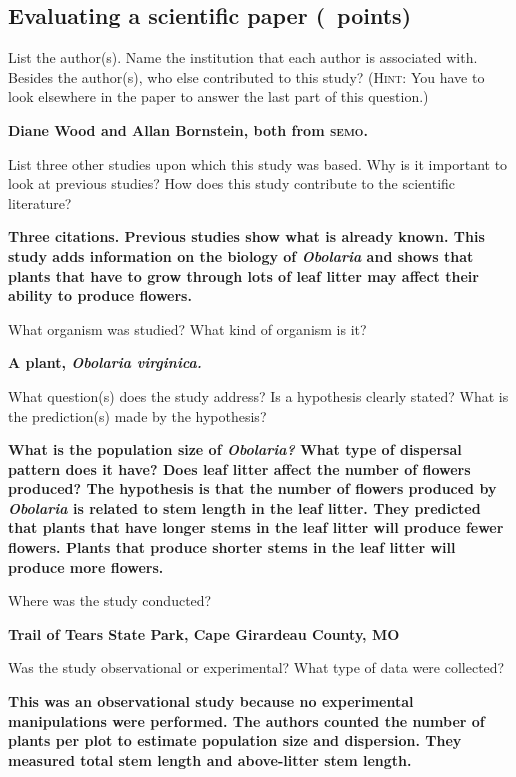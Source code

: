 \documentclass[12pt, hidelinks, addpoints]{exam}
\newcommand*\AnswerBox[2]{%
    \parbox[t][#1]{0.92\textwidth}{%
    \vspace{-0.5\baselineskip}\begin{solution}\textbf{#2}\end{solution}}
}
\newlength{\basespace}
\begin{document}
\subsection*{Evaluating a scientific paper (\numpoints~points)}

\begin{questions}

\question[1]
List the author(s). Name the institution that each author is associated with. 
Besides the author(s), who else contributed to this study? (\textsc{Hint:} You have to look elsewhere in the paper to answer the last part of this question.)

\AnswerBox{3\baselineskip}{%
Diane Wood and Allan Bornstein, both from \textsc{semo}.
}

\question[1]
List three other studies upon which this study was based. Why is it important to look at previous studies? How does this study contribute to the scientific literature?

\AnswerBox{1.75\basespace}{%
Three citations. Previous studies show what is already known. This study adds information on the biology of \textit{Obolaria} and shows that plants that have to grow through lots of leaf litter may affect their ability to produce flowers.
}

\question[1]
What organism was studied? What kind of organism is it?

\AnswerBox{2\baselineskip}{A plant, \textit{Obolaria virginica.}}


\question[1]
What question(s) does the study address? Is a hypothesis
clearly stated? What is the prediction(s) made by the hypothesis?

\AnswerBox{1.75\basespace}{What is the population size of \textit{Obolaria?} What type of dispersal pattern does it have? Does leaf litter affect the number of flowers produced? The hypothesis is that the number of flowers produced by \textit{Obolaria} is related to stem length in the leaf litter. They predicted that plants that have longer stems in the leaf litter will produce fewer flowers. Plants that produce shorter stems in the leaf litter will produce more flowers. }

\question[1]
Where was the study conducted?

\AnswerBox{2\baselineskip}{Trail of Tears State Park, Cape Girardeau County, MO}

\question[1]
Was the study observational or experimental? What type of data were collected? 

\AnswerBox{\basespace}{This was an observational study because no experimental manipulations were performed. The authors counted the number of plants per plot to estimate population size and dispersion. They measured total stem length and above-litter stem length.}



\end{questions}
\end{document}
